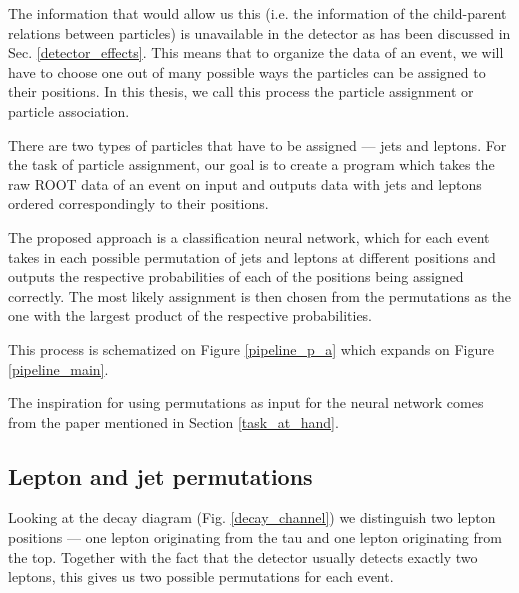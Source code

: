\documentclass{ctuthesis}
\begin{document}
The information that would allow us this (i.e. the information of the child-parent relations between particles) is unavailable in the detector as has been discussed in Sec. \ref{detector_effects}. This means that to organize the data of an event, we will have to choose one out of many possible ways the particles can be assigned to their positions. In this thesis, we call this process the particle assignment or particle association.

There are two types of particles that have to be assigned — jets and leptons. For the task of particle assignment, our goal is to create a program which takes the raw ROOT data of an event on input and outputs data with jets and leptons ordered correspondingly to their positions. 

The proposed approach is a classification neural network, which for each event takes in each possible permutation of jets and leptons at different positions and outputs the respective probabilities of each of the positions being assigned correctly. The most likely assignment is then chosen from the permutations as the one with the largest product of the respective probabilities.

This process is schematized on Figure \ref{pipeline_p_a} which expands on Figure \ref{pipeline_main}.

The inspiration for using permutations as input for the neural network comes from the paper \cite{parton_assignment} mentioned in Section \ref{task_at_hand}.

\begin{figure}[h]
\end{figure}

\subsection{Lepton and jet permutations}
Looking at the decay diagram (Fig. \ref{decay_channel}) we distinguish two lepton positions — one lepton originating from the tau and one lepton originating from the top. Together with the fact that the detector usually detects exactly two leptons, this gives us two possible permutations for each event.
\end{document}

